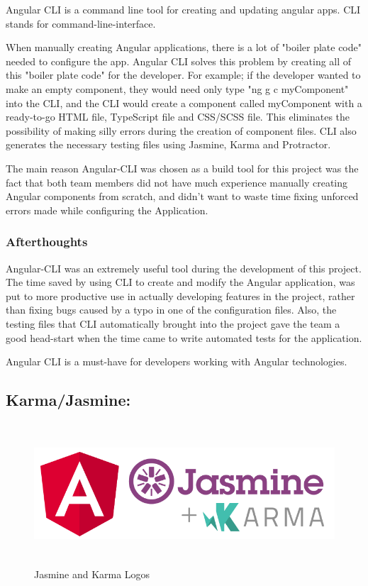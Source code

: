 \bigskip

Angular CLI is a command line tool for creating and updating angular apps. CLI stands for command-line-interface. 

When manually creating Angular applications, there is a lot of "boiler plate code" needed to configure the app. Angular CLI solves this problem by creating all of this "boiler plate code" for the developer. For example; if the developer wanted to make an empty component, they would need only type "ng g c myComponent" into the CLI, and the CLI would create a component called myComponent with a ready-to-go HTML file, TypeScript file and CSS/SCSS file. This eliminates the possibility of making silly errors during the creation of component files. CLI also generates the necessary testing files using Jasmine, Karma and Protractor.

\bigskip

The main reason Angular-CLI was chosen as a build tool for this project was the fact that both team members did not have much experience manually creating Angular components from scratch, and didn't want to waste time fixing unforced errors made while configuring the Application. 

\subsubsection{Afterthoughts}
Angular-CLI was an extremely useful tool during the development of this project. The time saved by using CLI to create and modify the Angular application, was put to more productive use in actually developing features in the project, rather than fixing bugs caused by a typo in one of the configuration files. Also, the testing files that CLI automatically brought into the project gave the team a good head-start when the time came to write automated tests for the application. 

\bigskip

Angular CLI is a must-have for developers working with Angular technologies.


\subsection{Karma/Jasmine:}
\label{sec:TechnologyReviewKarma}

\begin{figure}[H]
    \centering
    \includegraphics[width=\textwidth, height=150pt]{img/JasmineKarmaLogo.PNG}
    \caption{Jasmine and Karma Logos}
    \label{fig:my_label}
\end{figure}

